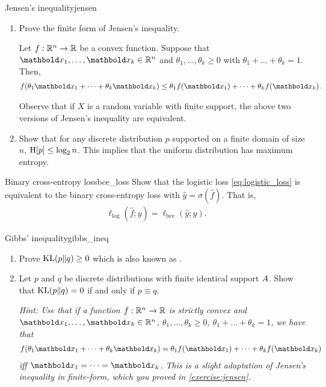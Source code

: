 \begin{nexercise}{Jensen's inequality}{jensen}
  \begin{enumerate}
    \item Prove the finite form of Jensen's inequality.

    \begin{thm}
      Let $f : \mathbb{R}^n \to \mathbb{R}$ be a convex function. Suppose that $\vx_1, \dots, \vx_k \in \R^n$ and $\theta_1, \dots, \theta_k \geq 0$ with $\theta_1 + \dots + \theta_k = 1$. Then, \begin{align}
        f(\theta_1 \vx_1 + \dots + \theta_k \vx_k) \leq \theta_1 f(\vx_1) + \dots + \theta_k f(\vx_k).
      \end{align}
    \end{thm}

    Observe that if $X$ is a random variable with finite support, the above two versions of Jensen's inequality are equivalent.

    \item Show that for any discrete distribution $p$ supported on a finite domain of size $n$, $\H{p} \leq \log_2 n$.
    This implies that the uniform distribution has maximum entropy.
  \end{enumerate}
\end{nexercise}

\begin{nexercise}{Binary cross-entropy loss}{bce_loss}
  Show that the logistic loss \eqref{eq:logistic_loss} is equivalent to the binary cross-entropy loss with $\hat{y} = \sigma(\hat{f})$.
  That is, \begin{align}
    \ell_\mathrm{log}(\hat{f}; y) = \ell_\mathrm{bce}(\hat{y}; y).
  \end{align}
\end{nexercise}

\begin{nexercise}{Gibbs' inequality}{gibbs_ineq}
  \begin{enumerate}
    \item Prove $\KL{p}{q} \geq 0$ which is also known as .
    \item Let $p$ and $q$ be discrete distributions with finite identical support $A$.
    Show that $\KL{p}{q} = 0$ if and only if $p \equiv q$.\par
    \textit{Hint: Use that if a function $f : \mathbb{R}^n \to \mathbb{R}$ is strictly convex and $\vx_1, \dots, \vx_k \in \R^n$, $\theta_1, \dots, \theta_k \geq 0$, $\theta_1 + \dots + \theta_k = 1$, we have that \begin{align}
      f(\theta_1 \vx_1 + \dots + \theta_k \vx_k) = \theta_1 f(\vx_1) + \dots + \theta_k f(\vx_k)
    \end{align} iff $\vx_1 = \dots = \vx_k$. This is a slight adaptation of Jensen's inequality in finite-form, which you proved in \cref{exercise:jensen}.}
  \end{enumerate}
\end{nexercise}

